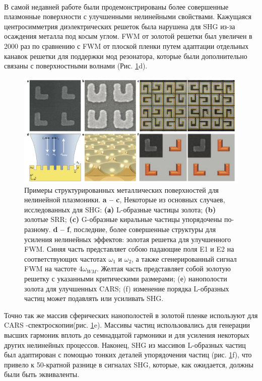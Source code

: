 \\
\hspace*{2mm}
В самой недавней работе были продемонстрированы более совершенные плазмонные поверхности с улучшенными нелинейными свойствами. Кажущаяся центросимметрия диэлектрических решеток была нарушена для SHG из-за осаждения металла под косым углом. FWM от золотой решетки был увеличен в 2000 раз по сравнению с FWM от плоской пленки путем адаптации отдельных канавок решетки для поддержки мод резонатора, которые были дополнительно связаны с поверхностными волнами \cite{genevet2010large} (Рис. \ref{mettals}d). 
\begin{figure}[h!]
	\centering
	\includegraphics[width=0.9\linewidth]{images/mettals.png}
	\caption{Примеры структурированных металлических поверхностей для нелинейной плазмоники. \textbf{a – c}, Некоторые из основных случаев, исследованных для SHG: \textbf{(а)} L-образные частицы золота; \textbf{(b) }золотые SRR; \textbf{(c)} G-образные киральные частицы упорядочены по-разному. \textbf{d – f},  последние, более совершенные структуры для усиления нелинейных эффектов: золотая решетка для улучшенного FWM. Синяя часть представляет собою падающие поля E1 и E2 на соответствующих частотах $\omega_1$ и $\omega_2$, а также сгенерированный сигнал FWM на частоте $4\omega_{WM}$. Желтая часть представляет собой золотую решетку с указанными критическими размерами; (е) нанополости золота для улучшенных CARS; (f) изменение порядка L-образных частиц может подавлять или усиливать SHG.}
	\label{mettals}
\end{figure}
Точно так же массив сферических нанополостей в золотой пленке используют для CARS -спектроскопии(рис. \ref{mettals}e). Массивы частиц использовались для генерации высших гармоник вплоть до семнадцатой гармоники \cite{kim2008high} и для усиления некоторых других нелинейных процессов. Наконец, SHG из массивов L-образных частиц был адаптирован с помощью тонких деталей упорядочения частиц (рис. \ref{mettals}f), что привело к 50-кратной разнице в сигналах SHG, которые, как ожидается, должны были быть эквиваленты.

